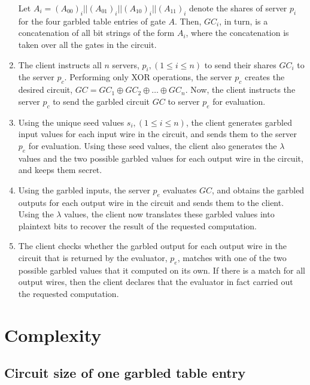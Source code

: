 \documentclass[10pt,journal,cspaper,compsoc]{IEEEtran}
\begin{document}
\begin{enumerate}
{        Let $A_i=(A_{00})_i || (A_{01})_i || (A_{10})_i || (A_{11})_i$ denote the shares of server $p_i$ for the four garbled table entries of gate $A$. Then, $GC_i$, in turn, is a concatenation of all bit strings of the form $A_i$, where the concatenation is taken over all the gates in the circuit.}

    \item{The client instructs all $n$ servers, $p_i, (1\le i\le n)$ to send their shares $GC_i$ to the server $p_c$. Performing only XOR operations, the server $p_c$ creates the desired circuit, $GC = GC_1\oplus GC_2\oplus \ldots \oplus GC_n$. Now, the client instructs the server $p_c$ to send the garbled circuit $GC$ to server $p_e$ for evaluation.}

    \item{Using the unique seed values $s_i, (1\le i\le n)$, the client generates garbled input values for each input wire in the circuit, and sends them to the server $p_e$ for evaluation. Using these seed values, the client also generates the $\lambda$ values and the two possible garbled values for each output wire in the circuit, and keeps them secret.}

    \item{Using the garbled inputs, the server $p_e$ evaluates $GC$, and obtains the garbled outputs for each output wire in the circuit and sends them to the client. Using the $\lambda$ values, the client now translates these garbled values into plaintext bits to recover the result of the requested computation.}

    \item{The client checks whether the garbled output for each output wire in the circuit that is returned by the evaluator, $p_e$, matches with one of the two possible garbled values that it computed on its own. If there is a match for all output wires, then the client declares that the evaluator in fact carried out the requested computation.}

\end{enumerate}


 \section{Complexity}
\label{sec_complexity}
\subsection{Circuit size of one garbled table entry}
\end{document}
